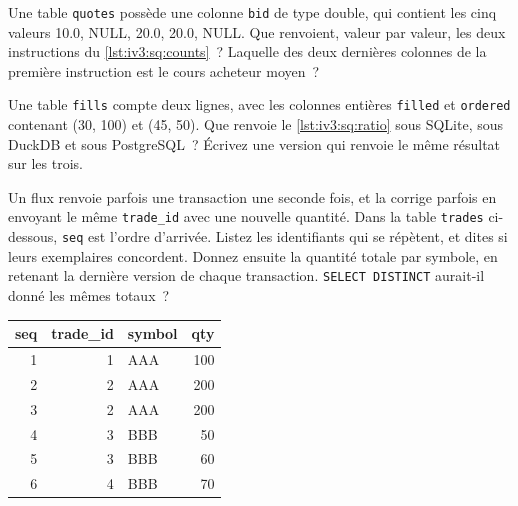 \begin{question}\label{iq:iv3:sql-and-data:4}
Une table \texttt{quotes} possède une colonne \texttt{bid} de type double, qui contient les cinq valeurs 10.0, NULL, 20.0, 20.0, NULL. Que renvoient, valeur par valeur, les deux instructions du \cref{lst:iv3:sq:counts}~? Laquelle des deux dernières colonnes de la première instruction est le cours acheteur moyen~?
\label{lst:iv3:sq:counts}
\end{question}

\begin{question}\label{iq:iv3:sql-and-data:5}
Une table \texttt{fills} compte deux lignes, avec les colonnes entières \texttt{filled} et \texttt{ordered} contenant (30, 100) et (45, 50). Que renvoie le \cref{lst:iv3:sq:ratio} sous SQLite, sous DuckDB et sous PostgreSQL~? Écrivez une version qui renvoie le même résultat sur les trois.
\label{lst:iv3:sq:ratio}
\end{question}

\begin{question}\label{iq:iv3:sql-and-data:6}
Un flux renvoie parfois une transaction une seconde fois, et la corrige parfois en envoyant le même \texttt{trade\_id} avec une nouvelle quantité. Dans la table \texttt{trades} ci-dessous, \texttt{seq} est l'ordre d'arrivée. Listez les identifiants qui se répètent, et dites si leurs exemplaires concordent. Donnez ensuite la quantité totale par symbole, en retenant la dernière version de chaque transaction. \texttt{SELECT DISTINCT} aurait-il donné les mêmes totaux~?
\begin{center}\small
\begin{tabular}{rrlr}
seq & trade\_id & symbol & qty\\\hline
1 & 1 & AAA & 100\\
2 & 2 & AAA & 200\\
3 & 2 & AAA & 200\\
4 & 3 & BBB & 50\\
5 & 3 & BBB & 60\\
6 & 4 & BBB & 70
\end{tabular}
\end{center}
\end{question}

